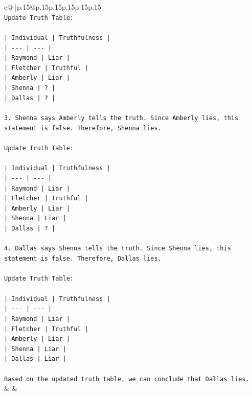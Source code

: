 \documentclass{article}
\begin{document}
{\begin{supertabular}{c@{$\;$}|p{.15\linewidth}@{}p{.15\linewidth}p{.15\linewidth}p{.15\linewidth}p{.15\linewidth}p{.15\linewidth}}
{{{\\ 
\texttt{Update Truth Table:} \\
\\ 
\texttt{| Individual | Truthfulness |} \\
\texttt{| {-}{-}{-} | {-}{-}{-} |} \\
\texttt{| Raymond | Liar |} \\
\texttt{| Fletcher | Truthful |} \\
\texttt{| Amberly | Liar |} \\
\texttt{| Shenna | ? |} \\
\texttt{| Dallas | ? |} \\
\\ 
\texttt{3. Shenna says Amberly tells the truth. Since Amberly lies, this statement is false. Therefore, Shenna lies.} \\
\\ 
\texttt{Update Truth Table:} \\
\\ 
\texttt{| Individual | Truthfulness |} \\
\texttt{| {-}{-}{-} | {-}{-}{-} |} \\
\texttt{| Raymond | Liar |} \\
\texttt{| Fletcher | Truthful |} \\
\texttt{| Amberly | Liar |} \\
\texttt{| Shenna | Liar |} \\
\texttt{| Dallas | ? |} \\
\\ 
\texttt{4. Dallas says Shenna tells the truth. Since Shenna lies, this statement is false. Therefore, Dallas lies.} \\
\\ 
\texttt{Update Truth Table:} \\
\\ 
\texttt{| Individual | Truthfulness |} \\
\texttt{| {-}{-}{-} | {-}{-}{-} |} \\
\texttt{| Raymond | Liar |} \\
\texttt{| Fletcher | Truthful |} \\
\texttt{| Amberly | Liar |} \\
\texttt{| Shenna | Liar |} \\
\texttt{| Dallas | Liar |} \\
\\ 
\texttt{Based on the updated truth table, we can conclude that Dallas lies.} \\
            }
        }
    }
    & & \\ \\


\end{supertabular}}
\end{document}
